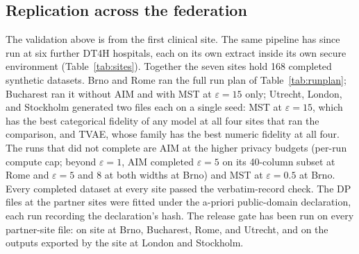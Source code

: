 \documentclass[11pt,a4paper]{article}
\newcommand{\eps}{\ensuremath{\varepsilon}}
\begin{document}
\subsection{Replication across the federation}
\label{sec:federation}

The validation above is from the first clinical site. The same pipeline has
since run at six further DT4H hospitals, each on its own extract inside its own
secure environment (Table~\ref{tab:sites}). Together the seven sites hold 168
completed synthetic datasets. Brno and Rome ran the full run plan of
Table~\ref{tab:runplan}; Bucharest ran it without AIM and with MST at
$\eps = 15$ only; Utrecht, London, and Stockholm generated two files each on a
single seed: MST at $\eps = 15$, which has the best categorical fidelity of any
model at all four sites that ran the comparison, and TVAE, whose family has the
best numeric fidelity at all four. The runs that did not complete are AIM at the
higher privacy budgets (per-run compute cap; beyond $\eps = 1$, AIM completed
$\eps = 5$ on its 40-column subset at Rome and $\eps = 5$ and $8$ at both widths
at Brno) and MST at $\eps = 0.5$ at Brno. Every completed dataset at every site
passed the verbatim-record check. The DP files at the partner sites were fitted
under the a-priori public-domain declaration, each run recording the
declaration's hash. The release gate has been run on every partner-site file: on
site at Brno, Bucharest, Rome, and Utrecht, and on the outputs exported by the
site at London and Stockholm.
\end{document}
